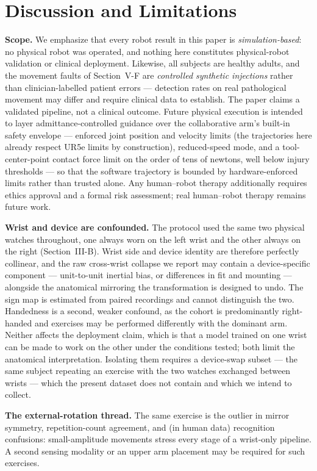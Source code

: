 \documentclass[conference]{IEEEtran}
\begin{document}
\section{Discussion and Limitations}
\textbf{Scope.} We emphasize that every robot result in this paper is
\emph{simulation-based}: no physical robot was operated, and nothing
here constitutes physical-robot validation or clinical deployment.
Likewise, all subjects are healthy adults, and the movement faults of
Section~V-F are \emph{controlled synthetic injections} rather than
clinician-labelled patient errors --- detection rates on real
pathological movement may differ and require clinical data to
establish. The paper claims a validated pipeline, not a clinical
outcome. Future physical execution is intended to layer
admittance-controlled guidance over the collaborative arm's built-in
safety envelope --- enforced joint position and velocity limits (the
trajectories here already respect UR5e limits by construction),
reduced-speed mode, and a tool-center-point contact force limit on
the order of tens of newtons, well below injury thresholds --- so that
the software trajectory is bounded by hardware-enforced limits rather
than trusted alone. Any human--robot therapy additionally requires
ethics approval and a formal risk assessment; real human--robot
therapy remains future work.

\textbf{Wrist and device are confounded.} The protocol used the same
two physical watches throughout, one always worn on the left wrist and
the other always on the right (Section~III-B). Wrist side and device
identity are therefore perfectly collinear, and the raw cross-wrist
collapse we report may contain a device-specific component ---
unit-to-unit inertial bias, or differences in fit and mounting ---
alongside the anatomical mirroring the transformation is designed to
undo. The sign map is estimated from paired recordings and cannot
distinguish the two. Handedness is a second, weaker confound, as the
cohort is predominantly right-handed and exercises may be performed
differently with the dominant arm. Neither affects the deployment claim, which is
that a model trained on one wrist can be made to work on the other
under the conditions tested; both limit the anatomical interpretation.
Isolating them requires a device-swap subset --- the same subject
repeating an exercise with the two watches exchanged between wrists
--- which the present dataset does not contain and which we intend to
collect.

\textbf{The external-rotation thread.} The same exercise is the
outlier in mirror symmetry, repetition-count agreement, and (in human
data) recognition confusions: small-amplitude movements stress every
stage of a wrist-only pipeline. A second sensing modality or an upper
arm placement may be required for such exercises.
\end{document}
